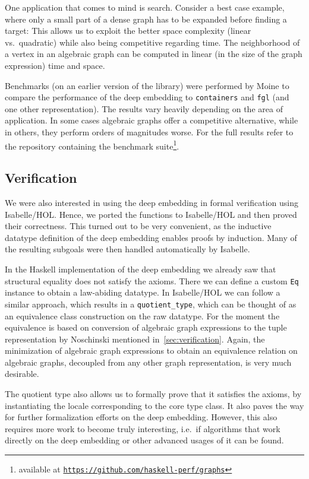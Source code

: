 \documentclass{article}
\newcommand{\hs}{\texttt}
\begin{document}
One application that comes to mind is search. Consider a best case example,
where only a small part of a dense graph has to be expanded before finding a target:
This allows us to exploit the better space complexity (linear vs.\ quadratic)
while also being competitive regarding time. The neighborhood of a vertex in an
algebraic graph can be computed in linear (in the size of the graph expression)
time and space.

Benchmarks (on an earlier version of the library) were performed by Moine to compare
the performance of the deep embedding to \texttt{containers} and \texttt{fgl}
(and one other representation). The results vary heavily depending on the area of
application. In some cases algebraic graphs offer a competitive alternative,
while in others, they perform orders of magnitudes worse. For the full results
refer to the repository containing the benchmark suite\footnote{available at
  \texttt{\href{https://github.com/haskell-perf/graphs}{https://github.com/haskell-perf/graphs}}}.

\subsection{Verification}\label{sec:quotient}
We were also interested in using the deep embedding in formal verification using
Isabelle/HOL. Hence, we ported the functions to Isabelle/HOL and then proved
their correctness. This
turned out to be very convenient, as the inductive datatype definition of the deep
embedding enables proofs by induction. Many of the resulting subgoals were then handled
automatically by Isabelle.

In the Haskell implementation of the deep embedding we already saw that
structural equality does not satisfy the axioms. There we can define a custom
\hs{Eq} instance to obtain a law-abiding datatype. In Isabelle/HOL we can follow
a similar approach, which results in a \texttt{quotient\_type}, which can be
thought of as an equivalence class construction on the raw datatype. For the
moment the equivalence is based on conversion of algebraic graph expressions to
the tuple representation by Noschinski mentioned in~\autoref{sec:verification}.
Again, the minimization of algebraic graph expressions to obtain an equivalence
relation on algebraic graphs, decoupled from any other graph representation, is
very much desirable.

The quotient type also allows us to formally prove that it satisfies the axioms,
by instantiating the locale corresponding to the core type class. It also paves
the way for further formalization efforts on the deep embedding. However, this
also requires more work to become truly interesting, i.e.\ if algorithms that
work directly on the deep embedding or other advanced usages of it can be found.
\end{document}
